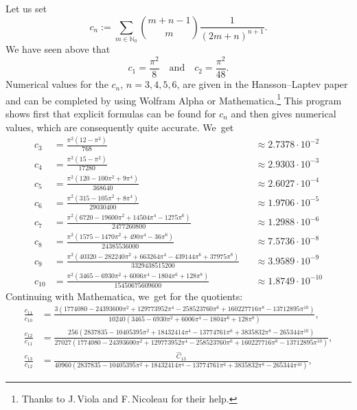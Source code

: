 \documentclass[10pt]{amsart}
\theoremstyle{definition}
\newcommand{\1}{\mathbbm{1}}
\newcommand{\N}{\mathbb{N}}
\begin{document}
Let us set
\begin{equation}\label{eq:defcn}
c_n := \sum_{m\in\N_0} \binom{m+n-1}{m} \frac{1}{(2m+n)^{n+1}}.
\end{equation}
We have seen above that
\[
c_1=\frac{\pi^2}8 \quad \text{and}\quad
c_2 = \frac{\pi^2}{48}.
\]
Numerical values for the $c_n$, $n=3,4,5,6$, are given in the Hansson--Laptev paper \cite{HL} and can be completed by using Wolfram Alpha or Mathematica.\footnote{Thanks to J.\,Viola and F.\,Nicoleau for their help.}
This program shows first that explicit formulas can be found for $c_n$ and then gives numerical values, which are consequently quite accurate. We~get
{\smaller\smaller
\[
\begin{aligned}
c_3 & = \frac{\pi^2(12-\pi^2)}{768} &&\approx 2.7378\cdot10^{-2}\\
c_4 & = \frac{\pi^2 (15-\pi^2)}{17280}&&\approx 2.9303 \cdot  10^{-3}\\
c_5& = \frac{\pi^2 (120-100\pi^2 + 9 \pi^4)}{368640}&&\approx 2.6027\cdot  10^{-4}\\
c_6&= \frac{\pi^2(315-105 \pi^2+ 8 \pi^4)}{29030400}&&\approx 1.9706 \cdot  10^{-5}\\
c_7&=\frac{\pi^2 (6720 - 19600 \pi^2 + 14504 \pi^4 - 1275 \pi^6)}{2477260800}&&\approx 1.2988\cdot 10^{-6}\\
c_8 &= \frac{\pi^2 (1575 - 1470 \pi^2 + 490 \pi ^4 - 36 \pi ^6)}{24385536000}&&\approx 7.5736\cdot10^{-8}\\
c_9&=\frac{\pi^2(40 320 - 282 240 \pi^2 + 663 264 \pi^4 - 439 144 \pi^6 + 37975 \pi^8)}{3329438515200}&&\approx 3.9589\cdot  10^{-9}\\
c_{10}&= \frac{\pi^2 (3465 - 6930 \pi^2 + 6006 \pi ^4 - 1804 \pi^6 + 128 \pi ^8)}{15450675609600}&&\approx1.8749\cdot10^{-10}
\end{aligned}
\]
}%
Continuing with Mathematica, we~get for the quotients:
{\smaller\smaller
\begin{align*}
\frac{c_{11}}{c_{10}} & = \frac{3 \left(1774080 - 24393600 \pi ^2 + 129773952 \pi ^4 - 258523760 \pi ^6 + 160227716 \pi ^8 - 13712895 \pi ^{10}\right)}{10240
\left(3465-6930 \pi ^2+6006 \pi ^4-1804 \pi ^6+128 \pi ^8\right)}, \\
\frac{c_{12}}{c_{11}} & = \frac{256 \left(2837835-10405395 \pi ^2 + 18432414 \pi ^4 - 13774761 \pi ^6 + 3835832 \pi ^8 - 265344 \pi ^{10}\right)}{27027
(1774080 \!-\! 24393600 \pi ^2 \!+\! 129773952 \pi ^4 \!-\! 258523760 \pi ^6 \!+\! 160227716 \pi ^8 \!-\! 13712895 \pi ^{10})},\\
\frac{c_{13}}{c_{12}} & = \frac{\hat C_{13}}{40960 \left(2837835 - 10405395 \pi ^2 + 18432414 \pi ^4 - 13774761 \pi ^6 + 3835832 \pi ^8 - 265344 \pi ^{10}\right)},
\end{align*}
}%
\end{document}
